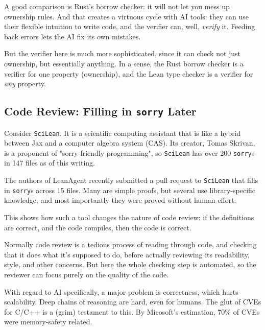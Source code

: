 \documentclass{article}
\begin{document}
A good comparison is Rust's borrow checker: it will not let you mess up ownership rules. And that creates a virtuous cycle with AI tools: they can use their flexible intuition to write code, and the verifier can, well, \textit{verify} it. Feeding back errors lets the AI fix its own mistakes.

But the verifier here is much more sophisticated, since it can check not just ownership, but essentially anything. In a sense, the Rust borrow checker is a verifier for one property (ownership), and the Lean type checker is a verifier for \textit{any} property.

\subsection{Code Review: Filling in \texttt{sorry} Later}

Consider \texttt{SciLean}. It is a scientific computing assistant that is like a hybrid between Jax and a computer algebra system (CAS). Its creator, Tomas Skrivan, is a proponent of "sorry-friendly programming", so \texttt{SciLean} has over 200 \texttt{sorry}s in 147 files as of this writing.

The authors of LeanAgent recently submitted a pull request to \texttt{SciLean} that fills in \texttt{sorry}s across 15 files. Many are simple proofs, but several use library-specific knowledge, and most importantly they were proved without human effort.

This shows how such a tool changes the nature of code review: if the definitions are correct, and the code compiles, then the code is correct.

Normally code review is a tedious process of reading through code, and checking that it does what it's supposed to do, before actually reviewing its readability, style, and other concerns. But here the whole checking step is automated, so the reviewer can focus purely on the quality of the code.

With regard to AI specifically, a major problem is correctness, which hurts scalability. Deep chains of reasoning are hard, even for humans. The glut of CVEs for C/C++ is a (grim) testament to this. By Micosoft's estimation, \~ 70\% of CVEs were memory-safety related.


\end{document}
